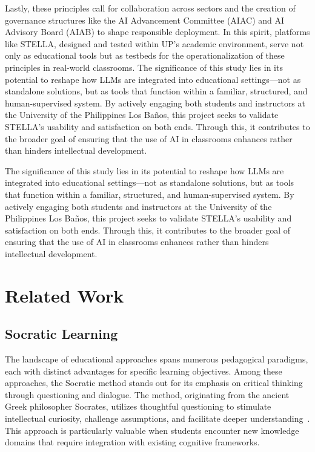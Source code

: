 \documentclass[sigconf,natbib=true]{acmart}
\begin{document}
Lastly, these principles call for collaboration across sectors and the creation of governance structures like the AI Advancement Committee (AIAC) and AI Advisory Board (AIAB) to shape responsible deployment. In this spirit, platforms like STELLA, designed and tested within UP's academic environment, serve not only as educational tools but as testbeds for the operationalization of these principles in real-world classrooms.
The significance of this study lies in its potential to reshape how LLMs are integrated into educational settings—not as standalone solutions, but as tools that function within a familiar, structured, and human-supervised system. By actively engaging both students and instructors at the University of the Philippines Los Baños, this project seeks to validate STELLA's usability and satisfaction on both ends. Through this, it contributes to the broader goal of ensuring that the use of AI in classrooms enhances rather than hinders intellectual development.

The significance of this study lies in its potential to reshape how LLMs are integrated into educational settings—not as standalone solutions, but as tools that function within a familiar, structured, and human-supervised system. By actively engaging both students and instructors at the University of the Philippines Los Baños, this project seeks to validate STELLA's usability and satisfaction on both ends. Through this, it contributes to the broader goal of ensuring that the use of AI in classrooms enhances rather than hinders intellectual development.

\section{Related Work}
\subsection{Socratic Learning}
The landscape of educational approaches spans numerous pedagogical paradigms,
each with distinct advantages for specific learning objectives. Among these
approaches, the Socratic method stands out for its emphasis on critical thinking through questioning and dialogue. The method, originating from the ancient Greek philosopher Socrates, utilizes thoughtful questioning to stimulate intellectual curiosity, challenge assumptions, and facilitate deeper understanding~\cite{m.goldinRedesigningEducationalPeer2012}. This approach is particularly valuable when students encounter new knowledge domains that require integration with existing cognitive frameworks.
\end{document}
